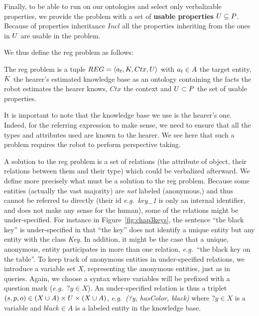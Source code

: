 \documentclass[a4paper,11pt,twoside]{StyleThese}
\begin{document}
\medskip
Finally, to be able to run on our ontologies and select only verbalizable properties, we provide the problem with a set of \textbf{usable properties} $U \subseteq P$. Because of properties inheritance $Incl$ all the properties inheriting from the ones in $U$ are usable in the problem.

We thus define the \acrshort{reg} problem as follows:
\begin{definition}
The \acrfull{reg} problem is a tuple $REG = \langle a_t, K, Ctx, U \rangle$ with $a_t \in A$ the target entity, $K$ the hearer's estimated knowledge base as an ontology containing the facts the robot estimates the hearer knows, $Ctx$ the context and $U \subset P$ the set of usable properties.
\end{definition}
It is important to note that the knowledge base we use is the hearer's one. Indeed, for the referring expression to make sense, we need to ensure that all the types and attributes used are known to the hearer. We see here that such a problem requires the robot to perform perspective taking.

A solution to the \acrshort{reg} problem is a set of relations (the attribute of object, their relations between them and their type) which could be verbalized afterward. We define more precisely what must be a solution to the \acrshort{reg} problem.
Because some entities (actually the vast majority) are \textit{not} labeled (anonymous,) and thus cannot be referred to directly (their id \textit{e.g.}~\textit{key\_1} is only an internal identifier, and does not make any sense for the human), some of the relations might be under-specified. For instance in Figure~\ref{fig:chap3keys}, the sentence ``the black key'' is under-specified in that ``the key'' does not identify a unique entity but any entity with the class \textit{Key}.
In addition, it might be the case that a unique, anonymous, entity participates in more than one relation, \textit{e.g.}~``the black key on the table''. 
To keep track of anonymous entities in under-specified relations, we introduce a variable set $X$, representing the anonymous entities, just as in \sparql{} queries. Again, we choose a syntax where variables will be prefixed with a question mark (\textit{e.g.}~$?y \in X$).
An under-specified relation is thus a triplet $(s, p, o) \in (X \cup A) \times U \times (X \cup A)$, \textit{e.g.}~\textit{(?y, hasColor, black)} where $?y \in X$ is a variable and $black \in A$ is a labeled entity in the knowledge base.
\end{document}
